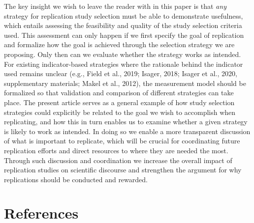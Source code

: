 \documentclass[
  english,
  man,floatsintext]{apa6}
\begin{document}
The key insight we wish to leave the reader with in this paper is that \emph{any} strategy for replication study selection must be able to demonstrate usefulness, which entails assessing the feasibility and quality of the study selection criteria used. This assessment can only happen if we first specify the goal of replication and formalize how the goal is achieved through the selection strategy we are proposing. Only then can we evaluate whether the strategy works as intended. For existing indicator-based strategies where the rationale behind the indicator used remains unclear (e.g., Field et al., 2019; Isager, 2018; Isager et al., 2020, supplementary materials; Makel et al., 2012), the measurement model should be formalized so that validation and comparison of different strategies can take place. The present article serves as a general example of how study selection strategies could explicitly be related to the goal we wish to accomplish when replicating, and how this in turn enables us to examine whether a given strategy is likely to work as intended. In doing so we enable a more transparent discussion of what is important to replicate, which will be crucial for coordinating future replication efforts and direct resources to where they are needed the most. Through such discussion and coordination we increase the overall impact of replication studies on scientific discourse and strengthen the argument for why replications should be conducted and rewarded.

\hypertarget{references}{%
\section*{References}\label{references}}
\end{document}
